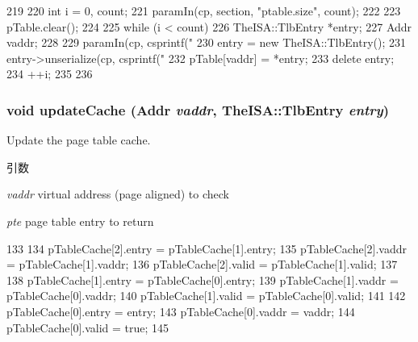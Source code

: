 \begin{DoxyCode}
219 {
220     int i = 0, count;
221     paramIn(cp, section, "ptable.size", count);
222 
223     pTable.clear();
224 
225     while (i < count) {
226         TheISA::TlbEntry *entry;
227         Addr vaddr;
228 
229         paramIn(cp, csprintf("%
230         entry = new TheISA::TlbEntry();
231         entry->unserialize(cp, csprintf("%
232         pTable[vaddr] = *entry;
233         delete entry;
234         ++i;
235     }
236 }
\end{DoxyCode}
\hypertarget{classPageTable_ad12e4d4887c4e62c2c8236936053dcd5}{
\subsubsection[{updateCache}]{\setlength{\rightskip}{0pt plus 5cm}void updateCache ({\bf Addr} {\em vaddr}, \/  TheISA::TlbEntry {\em entry})}}
\label{classPageTable_ad12e4d4887c4e62c2c8236936053dcd5}
Update the page table cache. 
\begin{DoxyParams}{引数}
\item[{\em vaddr}]virtual address (page aligned) to check \item[{\em pte}]page table entry to return \end{DoxyParams}



\begin{DoxyCode}
133     {
134         pTableCache[2].entry = pTableCache[1].entry;
135         pTableCache[2].vaddr = pTableCache[1].vaddr;
136         pTableCache[2].valid = pTableCache[1].valid;
137 
138         pTableCache[1].entry = pTableCache[0].entry;
139         pTableCache[1].vaddr = pTableCache[0].vaddr;
140         pTableCache[1].valid = pTableCache[0].valid;
141 
142         pTableCache[0].entry = entry;
143         pTableCache[0].vaddr = vaddr;
144         pTableCache[0].valid = true;
145     }
\end{DoxyCode}


